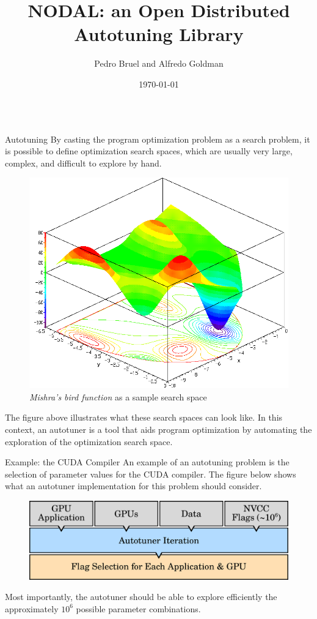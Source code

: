\documentclass{beamer}
\title{NODAL: an Open Distributed Autotuning Library}
\author[phrb@ime.usp.br]{Pedro Bruel and Alfredo Goldman}
\institute{University of São Paulo, Brazil}
\date{\today}
\begin{document}
\begin{frame}[fragile]
\begin{columns}[t]
    \begin{column}{.48\linewidth}
        \begin{block}{\Large Autotuning}
            \justifying
            \large
            By casting the program optimization problem as a search problem, it
            is possible to define optimization search spaces, which are usually
            very large, complex, and difficult to explore by hand.
            \begin{figure}[htpb]
                \includegraphics[width=0.6\linewidth]{sample_search_space}
                \caption{\emph{Mishra's bird function} as a sample search space}
                \label{fig:searchspace}
            \end{figure}
            The figure above illustrates what these search spaces can look
            like.  In this context, an autotuner is a tool that aids program
            optimization by automating the exploration of the optimization
            search space.
        \end{block}

        \begin{block}{\Large Example: the CUDA Compiler}
            \justifying
            \large
            An example of an autotuning problem is the selection of parameter
            values for the CUDA compiler. The figure below shows what an
            autotuner implementation for this problem should consider.
            \begin{figure}[htpb]
                \includegraphics[width=0.95\linewidth]{overview_gpus}
            \end{figure}
            Most importantly, the autotuner should be able to explore
            efficiently the approximately $10^6$ possible parameter
            combinations.
        \end{block}


\end{column}
\end{columns}
\end{frame}
\end{document}
